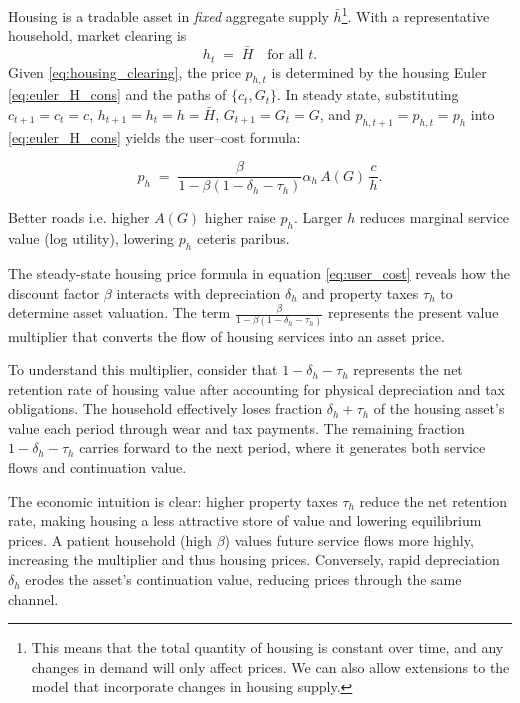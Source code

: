 Housing is a tradable asset in \emph{fixed} aggregate supply $\bar h$\footnote{This means that the total quantity of housing is constant over time, and any changes in demand will only affect prices. We can also allow extensions to the model that incorporate changes in housing supply.}. With a representative household, market clearing is
\begin{equation}
h_t \;=\; \bar H \quad \text{for all } t.
\label{eq:housing_clearing}
\end{equation}
Given \eqref{eq:housing_clearing}, the price $p_{h,t}$ is determined by the housing Euler \eqref{eq:euler_H_cons} and the paths of $\{c_t,G_t\}$. In steady state, substituting $c_{t+1}\!=\!c_t\!=\!c$, $h_{t+1}\!=\!h_t\!=\!h\!=\!\bar H$, $G_{t+1}\!=\!G_t\!=\!G$, and $p_{h,t+1}\!=\!p_{h,t}\!=\!p_h$ into \eqref{eq:euler_H_cons} yields the user–cost formula:

\begin{equation}
p_h \;=\; \frac{\beta}{1 - \beta(1 - \delta_h - \tau_h)} \alpha_h\,A(G)\,\dfrac{c}{h} .
\label{eq:user_cost}
\end{equation}

Better roads i.e. higher $A(G)$ higher raise $p_h$. Larger $h$ reduces marginal service value (log utility), lowering $p_h$ ceteris paribus.

The steady-state housing price formula in equation \eqref{eq:user_cost} reveals how the discount factor $\beta$ interacts with depreciation $\delta_h$ and property taxes $\tau_h$ to determine asset valuation. The term $\frac{\beta}{1 - \beta(1 - \delta_h - \tau_h)}$ represents the present value multiplier that converts the flow of housing services into an asset price.

To understand this multiplier, consider that $1 - \delta_h - \tau_h$ represents the net retention rate of housing value after accounting for physical depreciation and tax obligations. The household effectively loses fraction $\delta_h + \tau_h$ of the housing asset's value each period through wear and tax payments. The remaining fraction $1 - \delta_h - \tau_h$ carries forward to the next period, where it generates both service flows and continuation value.

The economic intuition is clear: higher property taxes $\tau_h$ reduce the net retention rate, making housing a less attractive store of value and lowering equilibrium prices. A patient household (high $\beta$) values future service flows more highly, increasing the multiplier and thus housing prices. Conversely, rapid depreciation $\delta_h$ erodes the asset's continuation value, reducing prices through the same channel.

